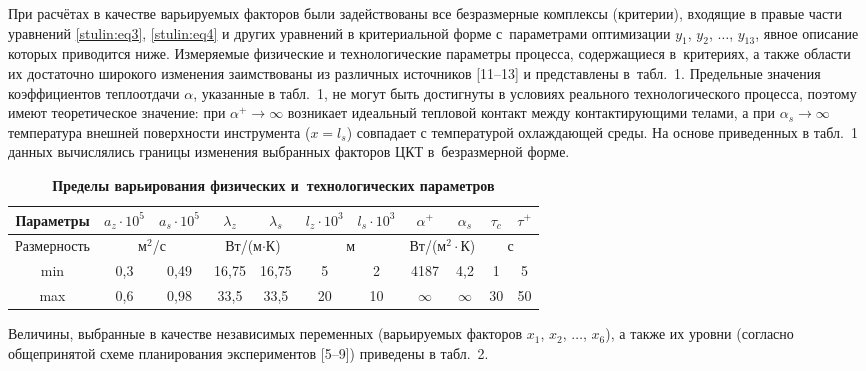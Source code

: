 При расчётах в качестве варьируемых факторов были задействованы все безразмерные комплексы (критерии), входящие в правые части
уравнений \eqref{stulin:eq3}, \eqref{stulin:eq4} и других уравнений в критериальной форме с~параметрами оптимизации $y_1$, $y_2$, $\dots$, $y_{13} $, явное описание которых приводится ниже. 
Измеряемые физические и технологические параметры процесса, содержащиеся в~критериях, а также области их достаточно широкого изменения заимствованы из различных источников [11--13] и представлены в~табл.~1. 
Предельные значения коэффициентов теплоотдачи $\alpha$, указанные в табл.~1, не могут быть достигнуты в условиях
реального технологического процесса, поэтому имеют теоретическое значение: при $\alpha ^+\to \infty $ возникает идеальный тепловой контакт между контактирующими телами, а при $\alpha _s \to \infty $ температура внешней поверхности инструмента ($x=l_s$) совпадает с температурой охлаждающей среды. На основе приведенных в табл.~1
данных вычислялись границы изменения выбранных факторов ЦКТ в~безразмерной форме.

\begin{table}[t!] 

\setlength{\tabcolsep}{4.5pt}
\centering \small
\caption{\bf Пределы варьирования физических и~технологических
параметров}\vspace{-3mm}
\begin{tabular}{c|c|c|c|c|c|c|c|c|c|c} \hline
\footnotesize Параметры & \footnotesize $a_z \cdot 10^{5}$  & \footnotesize $a_s \cdot 10^{5}$  & \footnotesize $\lambda_z$ & \footnotesize $\lambda_s$ & \footnotesize $l_z \cdot 10^{3}$ & \footnotesize $l_s \cdot 10^{3}$  & \footnotesize $\alpha ^+$ & \footnotesize $\alpha _s$ & \footnotesize $\tau_c$  & \footnotesize $\tau ^+ $ \\
\hline
\footnotesize Размерность & \multicolumn{2}{c}{\footnotesize м$^2$/с} & \multicolumn{2}{|c|}{\footnotesize Вт/(м$\cdot $К)}
& \multicolumn{2}{c}{\footnotesize м} & \multicolumn{2}{|c|}{\footnotesize Вт/(м$^2 \cdot $К)}
& \multicolumn{2}{c}{\footnotesize с}  \\
\hline
\rule{0mm}{12pt}%
min & 0,3 & 0,49&16,75&16,75&5&2&4187&4,2&1&5 \\
max & 0,6 & 0,98 & 33,5 & 33,5& 20& 10& $\infty $& $\infty $& 30& 50 \\
\hline
\end{tabular}
\end{table}

Величины, выбранные в качестве независимых переменных (варьируемых факторов
$x_1$, $x_2$, $\ldots$, $x_6 $), а также их уровни (согласно общепринятой схеме планирования экспериментов [5--9]) приведены в табл.~2.

